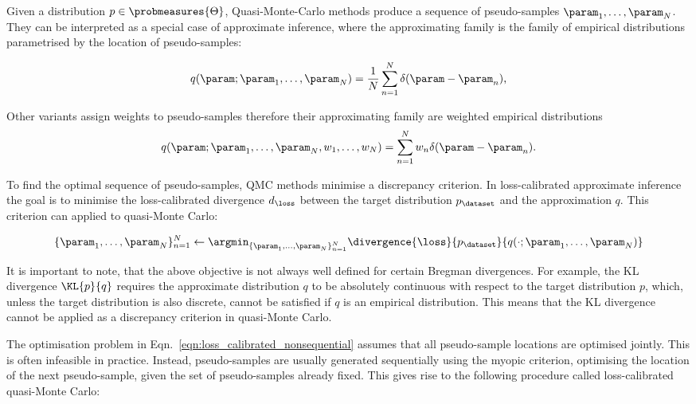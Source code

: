 Given a distribution $p\in\probmeasures{\Theta}$, Quasi-Monte-Carlo methods produce a sequence of pseudo-samples $\param_1,\ldots,\param_N$. They can be interpreted as a special case of approximate inference, where the approximating family is the family of empirical distributions parametrised by the location of pseudo-samples:

\begin{equation}
	q(\param ; \param_1,\ldots,\param_N) = \frac{1}{N} \sum_{n=1}^{N} \delta(\param - \param_n)\mbox{,}
\end{equation}

Other variants assign weights to pseudo-samples therefore their approximating family are weighted empirical distributions
\begin{equation}
	q(\param ; \param_1,\ldots,\param_N,w_1,\ldots,w_N) = \sum_{n=1}^{N} w_n \delta(\param - \param_n)\mbox{.}
\end{equation}

To find the optimal sequence of pseudo-samples, QMC methods minimise a discrepancy criterion. In loss-calibrated approximate inference the goal is to minimise the loss-calibrated divergence $d_\loss$ between the target distribution $p_\dataset$ and the approximation $q$. This criterion can applied to quasi-Monte Carlo:

\begin{equation}
	\{\param_1,\ldots,\param_N\}_{n=1}^{N} \leftarrow \argmin_{\{\param_1,\ldots,\param_N\}_{n=1}^{N}} \divergence{\loss}{p_\dataset}{q(\cdot ; \param_1,\ldots,\param_N)} \label{eqn:loss_calibrated_nonsequential}
\end{equation}

It is important to note, that the above objective is not always well defined for certain Bregman divergences. For example, the KL divergence $\KL{p}{q}$ requires the approximate distribution $q$ to be absolutely continuous with respect to the target distribution $p$, which, unless the target distribution is also discrete, cannot be satisfied if $q$ is an empirical distribution. This means that the KL divergence cannot be applied as a discrepancy criterion in quasi-Monte Carlo.

The optimisation problem in Eqn.\ \ref{eqn:loss_calibrated_nonsequential} assumes that all pseudo-sample locations are optimised jointly. This is often infeasible in practice. Instead, pseudo-samples are usually generated sequentially using the myopic criterion, optimising the location of the next pseudo-sample, given the set of pseudo-samples already fixed. This gives rise to the following procedure called loss-calibrated quasi-Monte Carlo:

